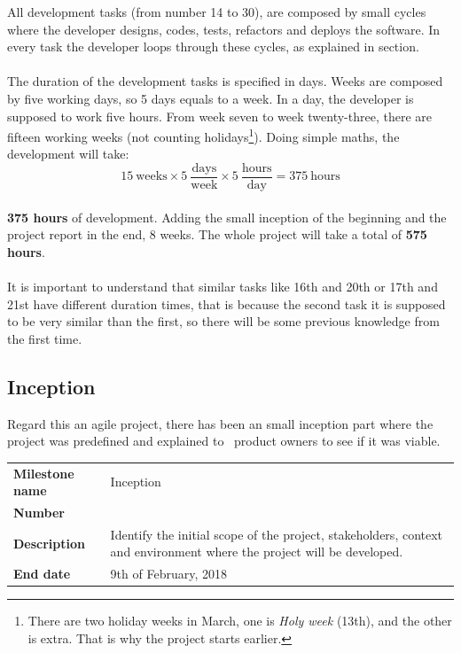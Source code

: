 All development tasks (from number 14 to 30), are composed by small cycles where the developer designs, codes, tests, refactors and deploys the software. In every task the developer loops through these cycles, as explained in  section.
\\\\
The duration of the development tasks is specified in days. Weeks are composed by five working days, so 5 days equals to a week. In a day, the developer is supposed to work five hours. From week seven to week twenty-three, there are fifteen working weeks (not counting holidays\footnote{There are two holiday weeks in March, one is \textit{Holy week} (13th), and the other is extra. That is why the project starts earlier.}). Doing simple maths, the development will take:
\\
$$15\ \textrm{weeks} \times 5\ \frac{\textrm{days}}{\textrm{week}} \times 5\ \frac{\textrm{hours}}{\textrm{day}} = 375\ \textrm{hours}$$
\\
\textbf{375 hours} of development. Adding the small inception of the beginning and the project report in the end, 8 weeks. The whole project will take a total of \textbf{575 hours}.
\\\\
It is important to understand that similar tasks like 16th and 20th or 17th and 21st have different duration times, that is because the second task it is supposed to be very similar than the first, so there will be some previous knowledge from the first time.


\subsection{Inception}

Regard this an agile project, there has been an small inception part where the project was predefined and explained to \company\ product owners to see if it was viable.

\begin{table}[H]
\begin{tabular}{>{\raggedleft\arraybackslash}p{3cm}>{\raggedright\arraybackslash}p{11cm}}
\textbf{Milestone name} & Inception \\
\textbf{Number}      & 1 \\
\textbf{Description} & Identify the initial scope of the project, stakeholders, context and environment where the project will be developed. \\
\textbf{End date}    & 9th of February, 2018 \\
\end{tabular}
\label{milestone1}
\end{table}

